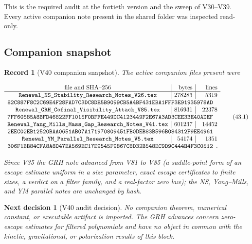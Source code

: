 \documentclass[11pt]{article}
\newtheorem{decision}[theorem]{Next decision}
\newtheorem{record}[theorem]{Record}
\theoremstyle{remark}
\begin{document}
This is the required audit at the fortieth version and the sweep of
V30--V39.  Every active companion note present in the shared folder
was inspected read-only.

\subsection{Companion snapshot}

\begin{record}[V40 companion snapshot]
\label{rec:v20v40-snapshot}
The active companion files present were

\[
\begin{array}{c|r|r}
\hbox{file and SHA--256}&\hbox{bytes}&\hbox{lines}\\ \hline
\texttt{Renewal\_NS\_Stability\_Research\_Notes\_V26.tex}
&278283&5319\\
\multicolumn{3}{l}{
\texttt{82C887F8C2C69E4F28FAD7C3DC8DE5B9099CB5A4BF431EBA1FFF3E91935978AD}}
\\
\texttt{Renewal\_GRH\_Cofinal\_Visibility\_Attack\_V85.tex}
&816931&22378\\
\multicolumn{3}{l}{
\texttt{7FF60585A8BFD46822FF1015F0BFFE449DC4123449F2E67A3AD3CEE3BE40ADEF}}
\\
\texttt{Renewal\_Yang\_Mills\_Mass\_Gap\_Research\_Notes\_V41.tex}
&601237&14452\\
\multicolumn{3}{l}{
\texttt{2EEC02EB12520BAA0651AB07A171970809451FB0DEB83B596B084312F9EE4961}}
\\
\texttt{Renewal\_YM\_Parallel\_Research\_Notes\_V5.tex}
&54174&1351\\
\multicolumn{3}{l}{
\texttt{306F1BB84CFA8A8D47EA569EC17E9545F9867C8D32B548EC9D9C444B4F3C0512}}.
\end{array}                                                     \tag{43.1}
\]

Since V35 the GRH note advanced from V81 to V85 (a saddle-point
form of an escape estimate uniform in a size parameter, exact escape
certificates to finite sizes, a verdict on a filter family, and a
real-factor zero law); the NS, Yang--Mills, and YM parallel notes are
unchanged by hash.
\end{record}

\begin{decision}[V40 audit decision]
\label{dec:v20v40-audit}
No companion theorem, numerical constant, or executable artifact is
imported.  The GRH advances concern zero-escape estimates for
filtered polynomials and have no object in common with the kinetic,
gravitational, or polarization results of this block.
\end{decision}
\end{document}
